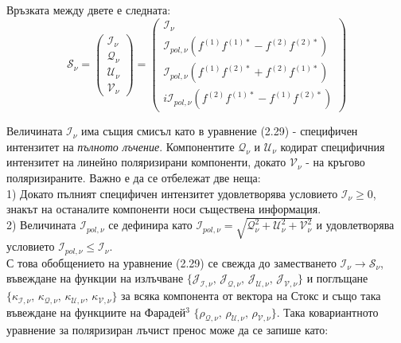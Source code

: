 Връзката между двете е следната:
\begin{equation}
	\mathcal{S}_\nu = \begin{pmatrix}
					\mathcal{I}_\nu \\
					\mathcal{Q}_\nu \\
					\mathcal{U}_\nu \\
					\mathcal{V}_\nu
				\end{pmatrix} = 
				\begin{pmatrix}
					\mathcal{I}_\nu \\
					\mathcal{I}_{pol, \nu} \left(f^{(1)} f^{(1)*} - f^{(2)} f^{(2)*} \right) \\
					\mathcal{I}_{pol, \nu} \left(f^{(1)} f^{(2)*} + f^{(2)} f^{(1)*} \right) \\
					i\mathcal{I}_{pol, \nu} \left(f^{(2)} f^{(1)*} - f^{(1)} f^{(2)*} \right)	
				\end{pmatrix} 
\end{equation}

Величината $\mathcal{I}_\nu$ има същия смисъл като в уравнение (2.29) - специфичен интензитет на \emph{пълното лъчение}. Компонентите $\mathcal{Q}_\nu$ и $\mathcal{U}_\nu$ кодират специфичния интензитет на линейно поляризирани компоненти, докато $\mathcal{V}_\nu$ - на кръгово поляризираните. Важно е да се отбележат две неща:\\

1) Докато пълният специфичен интензитет удовлетворява условието $\mathcal{I}_\nu \ge 0$, знакът на останалите компоненти носи съществена информация.\\

2) Величината $\mathcal{I}_{pol, \nu}$ се дефинира като $\mathcal{I}_{pol, \nu} = \sqrt{\mathcal{Q}_\nu^2 + \mathcal{U}_\nu^2 + \mathcal{V}_\nu^2}$ и удовлетворява условието $\mathcal{I}_{pol,\nu}\le\mathcal{I}_\nu$.\\

С това обобщението на уравнение (2.29) се свежда до заместването $\mathcal{I}_\nu \rightarrow \mathcal{S}_\nu$, въвеждане на функции на излъчване $\{\mathcal{J}_\mathcal{I,\nu}, \,\mathcal{J}_\mathcal{Q,\nu},\, \mathcal{J}_\mathcal{U,\nu},\, \mathcal{J}_\mathcal{V,\nu}\}$ и поглъщане $\{\kappa_\mathcal{I,\nu}, \,\kappa_\mathcal{Q,\nu},\, \kappa_\mathcal{U,\nu},\, \kappa_\mathcal{V,\nu}\}$ за всяка компонента от вектора на Стокс и също така въвеждане на функциите на Фарадей$^3$ $\{\rho_\mathcal{Q,\nu},\, \rho_\mathcal{U,\nu},\, \rho_\mathcal{V,\nu}\}$. Така ковариантното уравнение за поляризиран лъчист пренос може да се запише като:

